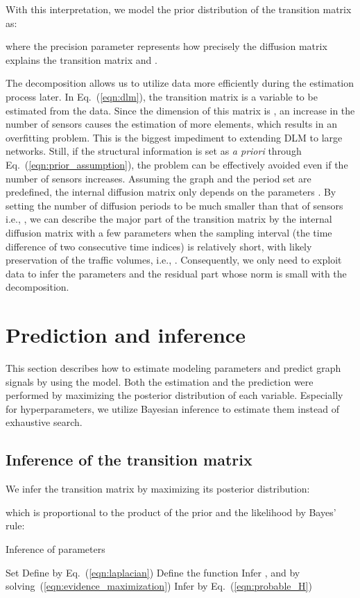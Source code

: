 \documentclass[journal]{IEEEtran}
\begin{document}
With this interpretation, we model the prior distribution of the transition matrix as:

where the precision parameter  represents how precisely the diffusion matrix explains the transition matrix and .


The decomposition allows us to utilize data more efficiently during the estimation process later.
In Eq.~(\ref{eqn:dlm}), the transition matrix is a variable to be estimated from the data. Since the dimension of this matrix is , an increase in the number of sensors causes the estimation of more elements, which results in an overfitting problem. This is the biggest impediment to extending DLM to large networks. Still, if the structural information is set as {\it{a priori}} through Eq.~(\ref{eqn:prior_assumption}), the problem can be effectively avoided even if the number of sensors increases.
Assuming the graph  and the period set  are predefined, the internal diffusion matrix only depends on the parameters . By setting the number of diffusion periods to be much smaller than that of sensors i.e., , we can describe the major part of the transition matrix by the internal diffusion matrix with a few parameters when the sampling interval (the time difference of two consecutive time indices) is relatively short, with likely preservation of the traffic volumes, i.e., .
Consequently, we only need to exploit data to infer the parameters  and the residual part whose norm is small with the decomposition.



\section{Prediction and inference}
This section describes how to estimate modeling parameters and predict graph signals by using the model. Both the estimation and the prediction were performed by maximizing the posterior distribution of each variable.
Especially for hyperparameters, we utilize Bayesian inference to estimate them instead of exhaustive search.

\subsection{Inference of the transition matrix}
We infer the transition matrix by maximizing its posterior distribution:

which is proportional to the product of the prior and the likelihood by Bayes' rule:


\begin{algorithm}[t!]
  \caption{Inference of parameters}\label{algo:inference_of_parameters}
  \begin{algorithmic}[1]
    \State Set 
    \State Define  by Eq.~(\ref{eqn:laplacian})
    \State Define the function 
    \For{}
    \State Infer ,  and  by solving~(\ref{eqn:evidence_maximization})
    \State Infer  by Eq.~(\ref{eqn:probable_H})
    \EndFor\\
    \Return 
    \EndFunction
  \end{algorithmic}
\end{algorithm}
\end{document}
